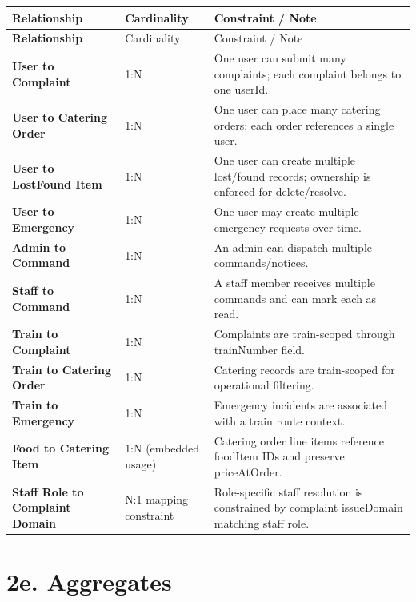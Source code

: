 \documentclass[12pt,a4paper]{report}
\begin{document}
\begin{longtable}{>{\bfseries}p{} p{} p{}}
\toprule
\rowcolor{TableHeader}
\textcolor{TableHeaderText}{Relationship} & \textcolor{TableHeaderText}{Cardinality} & \textcolor{TableHeaderText}{Constraint / Note} \\
\midrule
\endfirsthead
\toprule
\rowcolor{TableHeader}
\textcolor{TableHeaderText}{Relationship} & \textcolor{TableHeaderText}{Cardinality} & \textcolor{TableHeaderText}{Constraint / Note} \\
\midrule
\endhead
User to Complaint & 1:N & One user can submit many complaints; each complaint belongs to one userId. \\
User to Catering Order & 1:N & One user can place many catering orders; each order references a single user. \\
User to LostFound Item & 1:N & One user can create multiple lost/found records; ownership is enforced for delete/resolve. \\
User to Emergency & 1:N & One user may create multiple emergency requests over time. \\
Admin to Command & 1:N & An admin can dispatch multiple commands/notices. \\
Staff to Command & 1:N & A staff member receives multiple commands and can mark each as read. \\
Train to Complaint & 1:N & Complaints are train-scoped through trainNumber field. \\
Train to Catering Order & 1:N & Catering records are train-scoped for operational filtering. \\
Train to Emergency & 1:N & Emergency incidents are associated with a train route context. \\
Food to Catering Item & 1:N (embedded usage) & Catering order line items reference foodItem IDs and preserve priceAtOrder. \\
Staff Role to Complaint Domain & N:1 mapping constraint & Role-specific staff resolution is constrained by complaint issueDomain matching staff role. \\
\bottomrule
\end{longtable}

\section{2e. Aggregates}
\end{document}
